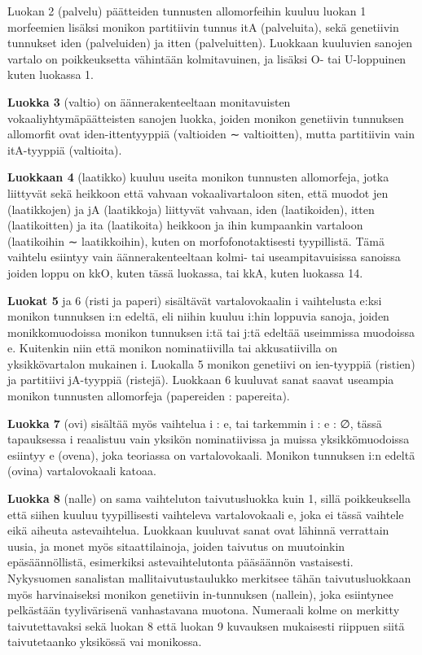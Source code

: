 \documentclass[free]{flammie}
\begin{document}
Luokan 2 (palvelu) päätteiden tunnusten allomorfeihin kuuluu luokan 1 morfeemien lisäksi monikon partitiivin tunnus itA (palveluita), sekä genetiivin tunnukset
iden (palveluiden) ja itten (palveluitten). Luokkaan kuuluvien sanojen vartalo on
poikkeuksetta vähintään kolmitavuinen, ja lisäksi O- tai U-loppuinen kuten luokassa 1.

\textbf{Luokka 3} (valtio) on äännerakenteeltaan monitavuisten vokaaliyhtymäpäätteisten
sanojen luokka, joiden monikon genetiivin tunnuksen allomorfit ovat iden-ittentyyppiä (valtioiden ∼ valtioitten), mutta partitiivin vain itA-tyyppiä (valtioita).

\textbf{Luokkaan 4} (laatikko) kuuluu useita monikon tunnusten allomorfeja, jotka liittyvät sekä heikkoon että vahvaan vokaalivartaloon siten, että muodot jen (laatikkojen) ja jA (laatikkoja) liittyvät vahvaan, iden (laatikoiden), itten (laatikoitten) ja ita (laatikoita) heikkoon ja
ihin kumpaankin vartaloon (laatikoihin ∼ laatikkoihin), kuten on morfofonotaktisesti tyypillistä. Tämä vaihtelu esiintyy vain äännerakenteeltaan kolmi- tai useampitavuisissa sanoissa joiden loppu on kkO, kuten tässä luokassa, tai kkA, kuten
luokassa 14.

\textbf{Luokat 5} ja 6 (risti ja paperi) sisältävät vartalovokaalin i vaihtelusta e:ksi monikon tunnuksen i:n edeltä, eli niihin kuuluu i:hin loppuvia sanoja, joiden monikkomuodoissa monikon tunnuksen i:tä tai j:tä edeltää useimmissa muodoissa e.
Kuitenkin niin että monikon nominatiivilla tai akkusatiivilla on yksikkövartalon
mukainen i.
Luokalla 5 monikon genetiivi on ien-tyyppiä (ristien) ja partitiivi jA-tyyppiä (ristejä). Luokkaan 6 kuuluvat sanat saavat useampia monikon tunnusten allomorfeja
(papereiden : papereita).

\textbf{Luokka 7} (ovi) sisältää myös vaihtelua i : e, tai tarkemmin i : e : ∅, tässä tapauksessa i reaalistuu vain yksikön nominatiivissa ja muissa yksikkömuodoissa
esiintyy e (ovena), joka teoriassa on vartalovokaali. Monikon tunnuksen i:n edeltä
(ovina) vartalovokaali katoaa.

\textbf{Luokka 8} (nalle) on sama vaihteluton taivutusluokka kuin 1, sillä poikkeuksella että siihen kuuluu tyypillisesti vaihteleva vartalovokaali e, joka ei tässä vaihtele eikä aiheuta astevaihtelua. Luokkaan kuuluvat sanat ovat lähinnä verrattain
uusia, ja monet myös sitaattilainoja, joiden taivutus on muutoinkin epäsäännöllistä, esimerkiksi astevaihtelutonta pääsäännön vastaisesti. Nykysuomen sanalistan
mallitaivutustaulukko merkitsee tähän taivutusluokkaan myös harvinaiseksi monikon genetiivin in-tunnuksen (nallein), joka esiintynee pelkästään tyylivärisenä
vanhastavana muotona.
Numeraali kolme on merkitty taivutettavaksi sekä luokan 8 että luokan 9 kuvauksen mukaisesti riippuen siitä taivutetaanko yksikössä vai monikossa.
\end{document}
